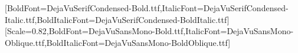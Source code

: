 \usepackage{mathtools}
\usepackage{mathrsfs}
\let\mathscr\symscr
\providecommand{\minf}{\mathscr C_\infty}
\setmainfont{DejaVuSerifCondensed.ttf}[BoldFont=DejaVuSerifCondensed-Bold.ttf,ItalicFont=DejaVuSerifCondensed-Italic.ttf,BoldItalicFont=DejaVuSerifCondensed-BoldItalic.ttf]
\setsansfont{Segoe UI}
\setmonofont{DejaVuSansMono.ttf}[Scale=0.82,BoldFont=DejaVuSansMono-Bold.ttf,ItalicFont=DejaVuSansMono-Oblique.ttf,BoldItalicFont=DejaVuSansMono-BoldOblique.ttf]
\newfontfamily{}
\AtBeginDocument{\renewcommand{\UrlFont}{\SourceLocatorFont}}
\usepackage{newunicodechar}
\setlength{\emergencystretch}{5em}
\newcommand{\sourcehash}[1]{\ifmmode\text{\nolinkurl{#1}}\else\nolinkurl{#1}\fi}

